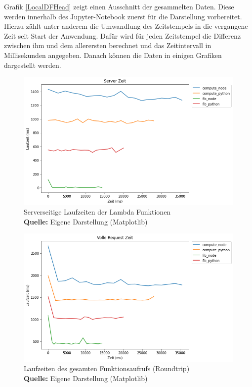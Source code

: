 \documentclass[12pt,a4paper,parskip=half]{scrreprt}
\newcommand*{\captionsource}[2]{%
	\caption[{#1}]{%
		#1%
		\\\hspace{\linewidth}%
		\textbf{Quelle:} #2%
	}%
}
\begin{document}
Grafik \ref{LocalDFHead} zeigt einen Ausschnitt der gesammelten Daten. Diese werden innerhalb des Jupyter-Notebook zuerst für die Darstellung vorbereitet. Hierzu zählt unter anderem die Umwandlung des Zeitstempels in die vergangene Zeit seit Start der Anwendung. Dafür wird für jeden Zeitstempel die Differenz zwischen ihm und dem allerersten berechnet und das Zeitintervall in Millisekunden angegeben. Danach können die Daten in einigen Grafiken dargestellt werden.
\\

\FloatBarrier
\begin{figure}[h!]
	\centering
	\includegraphics[scale=0.7]{aw_c_server_full}
	\captionsource{Serverseitige Laufzeiten der Lambda Funktionen}
	{Eigene Darstellung (Matplotlib)}
	\label{aw_c_server_full}
\end{figure}
\FloatBarrier

\FloatBarrier
\begin{figure}[h!]
	\centering
	\includegraphics[scale=0.7]{aw_c_client_full}
	\captionsource{Laufzeiten des gesamten Funktionsaufrufs (Roundtrip)}
	{Eigene Darstellung (Matplotlib)}
	\label{aw_c_client_full}
\end{figure}
\FloatBarrier
\end{document}
